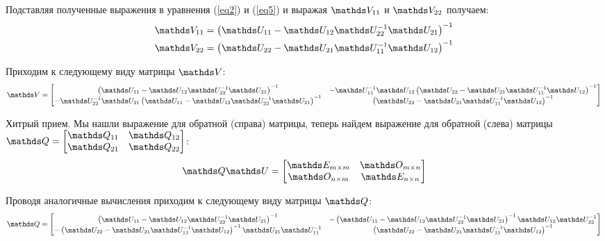 Подставляя полученные выражения в уравнения (\ref{eq2}) и (\ref{eq5}) и выражая $\bbV_{11}$ и $\bbV_{22}$ получаем:
\begin{gather}
\bbV_{11} = \lb \bbU_{11} - \bbU_{12} \bbU_{22}^{-1} \bbU_{21} \rb^{-1} \notag \\
\bbV_{22} = \lb \bbU_{22} - \bbU_{21} \bbU_{11}^{-1} \bbU_{12} \rb^{-1} \notag
\end{gather}

Приходим к следующему виду матрицы $\bbV$:
\begin{gather}
\bbV = \begin{bmatrix}
\lb \bbU_{11} - \bbU_{12} \bbU_{22}^{-1} \bbU_{21} \rb^{-1} & -\bbU_{11}^{-1} \bbU_{12} \lb \bbU_{22} - \bbU_{21} \bbU_{11}^{-1} \bbU_{12} \rb^{-1} \\
-\bbU_{22}^{-1} \bbU_{21} \lb \bbU_{11} - \bbU_{12} \bbU_{22}^{-1} \bbU_{21} \rb^{-1} &  \lb \bbU_{22} - \bbU_{21} \bbU_{11}^{-1} \bbU_{12} \rb^{-1} 
\end{bmatrix} \notag
\end{gather}

Хитрый прием. Мы нашли выражение для обратной (справа) матрицы, теперь найдем выражение для обратной (слева) матрицы $\bbQ = \begin{bmatrix} \bbQ_{11} & \bbQ_{12} \\ \bbQ_{21} & \bbQ_{22} \end{bmatrix}$:
\begin{gather}
\bbQ \bbU = \begin{bmatrix}
\bbE_{m \times m} & \bbO_{m \times n} \\
\bbO_{n \times m} & \bbE_{n \times n} 
\end{bmatrix} \notag 
\end{gather} 

Проводя аналогичные вычисления приходим к следующему виду матрицы $\bbQ$:
\begin{gather}
\bbQ = \begin{bmatrix}
\lb \bbU_{11} - \bbU_{12} \bbU_{22}^{-1} \bbU_{21} \rb^{-1} & - \lb \bbU_{11} - \bbU_{12} \bbU_{22}^{-1} \bbU_{21} \rb^{-1} \bbU_{12} \bbU_{22}^{-1} \\
- \lb \bbU_{22} - \bbU_{21} \bbU_{11}^{-1} \bbU_{12} \rb^{-1} \bbU_{21} \bbU_{11}^{-1} & \lb \bbU_{22} - \bbU_{21} \bbU_{11}^{-1} \bbU_{12} \rb^{-1} 
\end{bmatrix} \notag
\end{gather}

